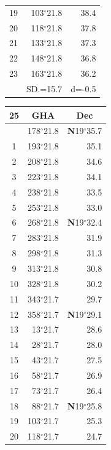 \documentclass[10pt, a4paper]{report}
\begin{document}
\begin{scriptsize}
\begin{tabular*}{0.2\textwidth}[t]{@{\extracolsep{\fill}}|c|rr|}
19 & 103$^\circ$21.8 & 38.4\\
20 & 118$^\circ$21.8 & 37.8\\
21 & 133$^\circ$21.8 & \raisebox{0.24ex}{\boldmath$\cdot$~\boldmath$\cdot$~~}37.3\\
22 & 148$^\circ$21.8 & 36.8\\
23 & 163$^\circ$21.8 & 36.2\\
\hline
\rule{0pt}{2.4ex} & \multicolumn{1}{c}{SD.=15.7} & \multicolumn{1}{c|}{d=-0.5}\\
\hline
\end{tabular*}\noindent
\begin{tabular*}{0.2\textwidth}[t]{@{\extracolsep{\fill}}|c|rr|}
\hline
\multicolumn{1}{|c|}{\rule{0pt}{2.6ex}\textbf{25}} & \multicolumn{1}{c}{\textbf{GHA}} & \multicolumn{1}{c|}{\textbf{Dec}}\\
\hline\rule{0pt}{2.6ex}\noindent
0 & 178$^\circ$21.8 & \textbf{N}19$^\circ$35.7\\
1 & 193$^\circ$21.8 & 35.1\\
2 & 208$^\circ$21.8 & 34.6\\
3 & 223$^\circ$21.8 & \raisebox{0.24ex}{\boldmath$\cdot$~\boldmath$\cdot$~~}34.1\\
4 & 238$^\circ$21.8 & 33.5\\
5 & 253$^\circ$21.8 & 33.0\\[2Pt]
6 & 268$^\circ$21.8 & \textbf{N}19$^\circ$32.4\\
7 & 283$^\circ$21.8 & 31.9\\
8 & 298$^\circ$21.8 & 31.3\\
9 & 313$^\circ$21.8 & \raisebox{0.24ex}{\boldmath$\cdot$~\boldmath$\cdot$~~}30.8\\
10 & 328$^\circ$21.8 & 30.2\\
11 & 343$^\circ$21.7 & 29.7\\[2Pt]
12 & 358$^\circ$21.7 & \textbf{N}19$^\circ$29.1\\
13 & 13$^\circ$21.7 & 28.6\\
14 & 28$^\circ$21.7 & 28.0\\
15 & 43$^\circ$21.7 & \raisebox{0.24ex}{\boldmath$\cdot$~\boldmath$\cdot$~~}27.5\\
16 & 58$^\circ$21.7 & 26.9\\
17 & 73$^\circ$21.7 & 26.4\\[2Pt]
18 & 88$^\circ$21.7 & \textbf{N}19$^\circ$25.8\\
19 & 103$^\circ$21.7 & 25.3\\
20 & 118$^\circ$21.7 & 24.7\\

\end{tabular*}
\end{scriptsize}
\end{document}
